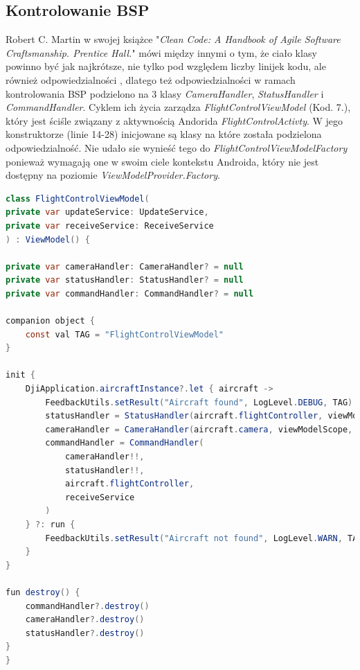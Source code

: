 \subsection{Kontrolowanie BSP}

Robert C. Martin w swojej książce "\textit{Clean Code: A Handbook of Agile Software Craftsmanship. Prentice Hall.}" mówi między innymi o tym, że ciało klasy powinno być jak najkrótsze, nie tylko pod względem liczby linijek kodu, ale również odpowiedzialności \cite{clean-code}, dlatego też odpowiedzialności w ramach kontrolowania BSP podzielono na 3 klasy \textit{CameraHandler}, \textit{StatusHandler} i \textit{CommandHandler}. Cyklem ich życia zarządza \textit{FlightControlViewModel} (Kod. 7.), który jest ściśle związany z aktywnością Andorida \textit{FlightControlActivty}. W jego konstruktorze (linie 14-28) inicjowane są klasy na które została podzielona odpowiedzialność. Nie udało sie wynieść tego do \textit{FlightControlViewModelFactory} ponieważ wymagają one w swoim ciele kontekstu Androida, który nie jest dostępny na poziomie \textit{ViewModelProvider.Factory}. \cite{clean-code}

\begin{lstlisting}[language=Java, caption=Klasa \textit{FlightControlViewModel}]
class FlightControlViewModel(
private var updateService: UpdateService,
private var receiveService: ReceiveService
) : ViewModel() {

private var cameraHandler: CameraHandler? = null
private var statusHandler: StatusHandler? = null
private var commandHandler: CommandHandler? = null

companion object {
    const val TAG = "FlightControlViewModel"
}

init {
    DjiApplication.aircraftInstance?.let { aircraft ->
        FeedbackUtils.setResult("Aircraft found", LogLevel.DEBUG, TAG)
        statusHandler = StatusHandler(aircraft.flightController, viewModelScope, updateService)
        cameraHandler = CameraHandler(aircraft.camera, viewModelScope, updateService)
        commandHandler = CommandHandler(
            cameraHandler!!,
            statusHandler!!,
            aircraft.flightController,
            receiveService
        )
    } ?: run {
        FeedbackUtils.setResult("Aircraft not found", LogLevel.WARN, TAG)
    }
}

fun destroy() {
    commandHandler?.destroy()
    cameraHandler?.destroy()
    statusHandler?.destroy()
}
}
\end{lstlisting}

